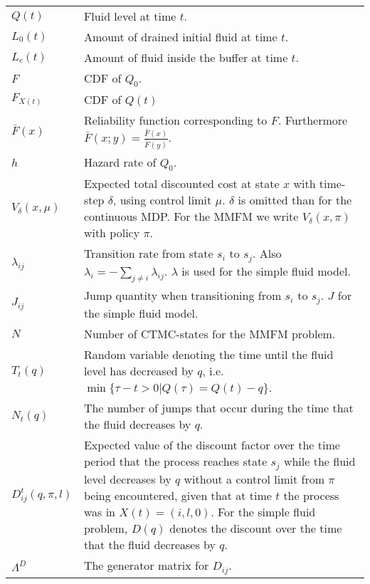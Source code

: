 \begin{tabularx}{\linewidth}{l|L}
        $Q(t)$& Fluid level at time $t$.\\
        $L_0(t)$& Amount of drained initial fluid at time $t$.\\
        $L_c(t)$& Amount of fluid inside the buffer at time $t$.\\
        $F$ & CDF of $Q_0$.\\
        $F_{X(t)}$ & CDF of $Q(t)$\\
        $\bar F(x)$& Reliability function corresponding to $F$. Furthermore $\bar F(x;y)=\frac{\bar F(x)}{\bar F(y)}$.\\
        $h$& Hazard rate of $Q_0$.\\                       
		$V_\delta(x,\mu)$ & Expected total discounted cost at state $x$ with time-step $\delta$, using control limit $\mu$. $\delta$ is omitted than for the continuous MDP. For the MMFM we write $V_\delta(x,\pi)$ with policy $\pi$.            \\
		$\lambda_{ij}$& Transition rate from state $s_i$ to $s_j$. Also $\lambda_i=-\sum_{j\neq i}\lambda_{ij}$. $\lambda$ is used for the simple fluid model.\\
		$J_{ij}$& Jump quantity when transitioning from $s_i$ to $s_j$. $J$ for the simple fluid model.\\
		$N$& Number of CTMC-states for the MMFM problem.\\
		$T_t(q)$&Random variable denoting the time until the fluid level has decreased by $q$, i.e. $\min\{\tau-t>0|Q(\tau)=Q(t)-q\}$.\\
		$N_t(q)$&The number of jumps that occur during the time that the fluid decreases by $q$.\\
		$D_{ij}^t(q,\pi,l)$&Expected value of the discount factor over the time period that the process reaches state $s_j$ while the fluid level decreases by $q$ without a control limit from $\pi$ being encountered, given that at time $t$ the process was in $X(t)= (i,l,0)$. For the simple fluid problem, $D(q)$ denotes the discount over the time that the fluid decreases by $q$.\\
		$\Lambda^D$&The generator matrix for $D_{ij}$.\\
	\end{tabularx}
